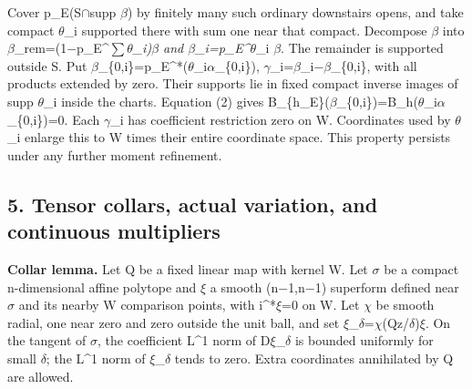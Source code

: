 \documentclass[
  10pt,
]{article}
\begin{document}
Cover p\_E(S\ensuremath{\cap}supp \ensuremath{\beta}) by finitely many such ordinary downstairs opens,
and take compact \ensuremath{\theta}\_i supported there with sum one near that compact.
Decompose \ensuremath{\beta} into \ensuremath{\beta}\_rem=(1\ensuremath{-}p\_E\^{}\emph{\ensuremath{\sum}\ensuremath{\theta}\_i)\ensuremath{\beta} and \ensuremath{\beta}\_i=p\_E\^{}}\ensuremath{\theta}\_i
\ensuremath{\beta}. The remainder is supported outside S. Put
\ensuremath{\beta}\_\{0,i\}=p\_E\^{}*(\ensuremath{\theta}\_i\ensuremath{\alpha}\_\{0,i\}), \ensuremath{\gamma}\_i=\ensuremath{\beta}\_i\ensuremath{-}\ensuremath{\beta}\_\{0,i\}, with all
products extended by zero. Their supports lie in fixed compact inverse
images of supp \ensuremath{\theta}\_i inside the charts. Equation (2) gives
B\_\{h\_E\}(\ensuremath{\beta}\_\{0,i\})=B\_h(\ensuremath{\theta}\_i\ensuremath{\alpha}\_\{0,i\})=0. Each \ensuremath{\gamma}\_i has
coefficient restriction zero on W. Coordinates used by \ensuremath{\theta}\_i enlarge this
to W times their entire coordinate space. This property persists under
any further moment refinement.

\subsection{5. Tensor collars, actual variation, and continuous
multipliers}\label{tensor-collars-actual-variation-and-continuous-multipliers}

\textbf{Collar lemma.} Let Q be a fixed linear map with kernel W. Let \ensuremath{\sigma}
be a compact n-dimensional affine polytope and \ensuremath{\xi} a smooth (n\ensuremath{-}1,n\ensuremath{-}1)
superform defined near \ensuremath{\sigma} and its nearby W comparison points, with
i\^{}*\ensuremath{\xi}=0 on W. Let \ensuremath{\chi} be smooth radial, one near zero and zero outside
the unit ball, and set \ensuremath{\xi}\_\ensuremath{\delta}=\ensuremath{\chi}(Qz/\ensuremath{\delta})\ensuremath{\xi}. On the tangent of \ensuremath{\sigma}, the
coefficient L\^{}1 norm of D\ensuremath{\xi}\_\ensuremath{\delta} is bounded uniformly for small \ensuremath{\delta}; the
L\^{}1 norm of \ensuremath{\xi}\_\ensuremath{\delta} tends to zero. Extra coordinates annihilated by Q
are allowed.
\end{document}
